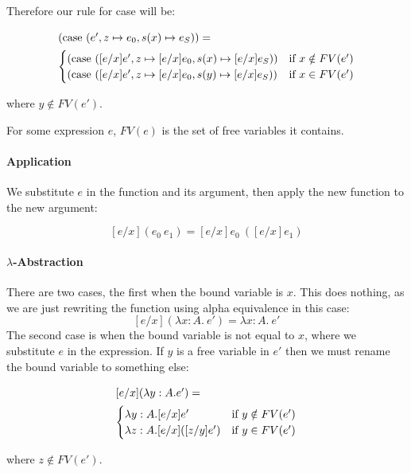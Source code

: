 Therefore our rule for case will be:

\begin{minipage}{4in}
\begin{align*}
\intertext{$(\operatorname{case} \ (e', z \mapsto e_0, s(x) \mapsto e_S))=$}
  \begin{cases}
            (\operatorname{case} \ ([e/x]e', z \mapsto [e/x]e_0, s(x) \mapsto [e/x]e_S)) & \text{if } x \notin FV(e')  \\
            (\operatorname{case} \ ([e/x]e', z \mapsto [e/x]e_0, s(y) \mapsto [e/x]e_S)) & \text{if } x \in FV(e')
  \end{cases}
\end{align*} 
\end{minipage}

where $y \notin FV(e')$. 

For some expression $e$, $FV(e)$ is the set of free variables it contains.

\paragraph{Application} We substitute $e$ in the function and its argument, then apply the new function to the new argument:

\[ [e/x] (e_0 \ e_1) = [e/x]e_0 \ ([e/x]e_1) \]

\paragraph{$\lambda$-Abstraction} There are two cases, the first when the bound variable is $x$. This does nothing, as we are just rewriting the function using alpha equivalence in this case:
\[ [e/x](\lambda x:A. \ e') = \lambda x:A. \ e' \]
The second case is when the bound variable is not equal to $x$, where we substitute $e$ in the expression. If $y$ is a free variable in $e'$ then we must rename the bound variable to something else:

\begin{minipage}{4in}
\begin{align*}
\intertext{$[e/x](\lambda y:A.e')=$}
  \begin{cases}
            \lambda y:A. [e/x]e' & \text{if } y \notin FV(e')  \\
           \lambda z:A. [e/x]([z/y]e') & \text{if } y \in FV(e')
  \end{cases}
\end{align*} 
\end{minipage}

where $z \notin FV(e')$.

